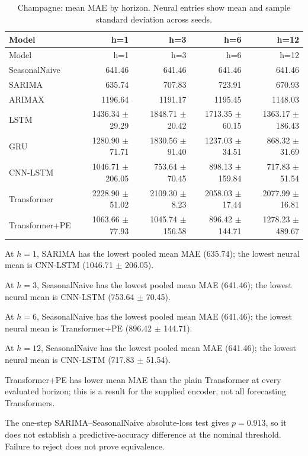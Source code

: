 \documentclass[10pt,a4paper]{article}
\begin{document}
\begin{center}\begingroup\footnotesize\setlength{\tabcolsep}{3pt}\begin{longtable}{@{}lrrrr@{}}\caption{Champagne: mean MAE by horizon. Neural entries show mean and sample standard deviation across seeds.}\\\toprule Model & h=1 & h=3 & h=6 & h=12\\\midrule\endfirsthead\toprule Model & h=1 & h=3 & h=6 & h=12\\\midrule\endhead SeasonalNaive & 641.46 & 641.46 & 641.46 & 641.46 \\
SARIMA & 635.74 & 707.83 & 723.91 & 670.93 \\
ARIMAX & 1196.64 & 1191.17 & 1195.45 & 1148.03 \\
LSTM & 1436.34 $\pm$ 29.29 & 1848.71 $\pm$ 20.42 & 1713.35 $\pm$ 60.15 & 1363.17 $\pm$ 186.43 \\
GRU & 1280.90 $\pm$ 71.71 & 1830.56 $\pm$ 91.40 & 1237.03 $\pm$ 34.51 & 868.32 $\pm$ 31.69 \\
CNN-LSTM & 1046.71 $\pm$ 206.05 & 753.64 $\pm$ 70.45 & 898.13 $\pm$ 159.84 & 717.83 $\pm$ 51.54 \\
Transformer & 2228.90 $\pm$ 51.02 & 2109.30 $\pm$ 8.23 & 2058.03 $\pm$ 17.44 & 2077.99 $\pm$ 16.81 \\
Transformer+PE & 1063.66 $\pm$ 77.93 & 1045.74 $\pm$ 156.58 & 896.42 $\pm$ 144.71 & 1278.23 $\pm$ 489.67 \\\bottomrule\end{longtable}\endgroup\end{center}
At $h=1$, SARIMA has the lowest pooled mean MAE (635.74); the lowest neural mean is CNN-LSTM (1046.71 $\pm$ 206.05).

At $h=3$, SeasonalNaive has the lowest pooled mean MAE (641.46); the lowest neural mean is CNN-LSTM (753.64 $\pm$ 70.45).

At $h=6$, SeasonalNaive has the lowest pooled mean MAE (641.46); the lowest neural mean is Transformer+PE (896.42 $\pm$ 144.71).

At $h=12$, SeasonalNaive has the lowest pooled mean MAE (641.46); the lowest neural mean is CNN-LSTM (717.83 $\pm$ 51.54).

Transformer+PE has lower mean MAE than the plain Transformer at every evaluated horizon; this is a result for the supplied encoder, not all forecasting Transformers.

The one-step SARIMA--SeasonalNaive absolute-loss test gives $p=0.913$, so it does not establish a predictive-accuracy difference at the nominal threshold. Failure to reject does not prove equivalence.
\end{document}
